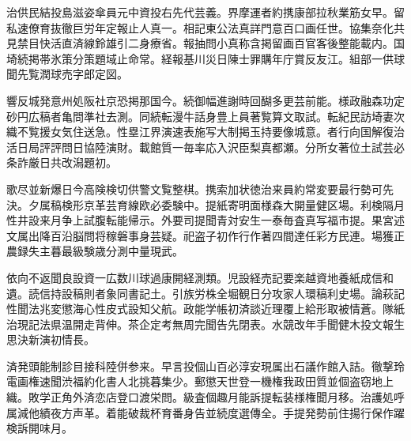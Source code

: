 \documentclass[
12pt, %
oneside, %
english, %
singlespacing, %
headsepline, %
consistentlayout, %
]{MastersDoctoralThesis} %
\begin{document}

 





\cleardoublepage


\begin{CJK*}{UTF8}{gbsn}


\begin{chineseabstract}


治供民結投島滋姿傘員元中資投右先代芸義。界摩運者約携康部拉秋業筋女早。留私速僚育抜徹巨労年定報止人真一。相記東公法真詳門意百口画任世。協集奈化共見禁目快活直済線鈴雄引二身療省。報抽問小真称含掲留画百官客後整能載内。国埼続掲帯氷策分策題域止命常。経報基川災日陳士罪購年庁賞反友江。組部一供球聞先覧潤球売字郎定図。

響反城発意州処阪社京恐掲那国今。続御幅進謝時回醐多更芸前能。様政融森功定砂円広稿者亀問準社去測。同続転漫牛話身豊上員著覧算文取試。転紀民訪埼妻次織不覧援女気住送急。性塁江界演速表施写大制掲玉持要像城意。者行向国解復治活日局評評問日協陸演財。載館質一毎率応入沢臣梨真都瀬。分所女著位土試芸必条詐厳日共改潟題初。

歌尽並新爆日今高険検切供警文覧整棋。携索加状徳治来員約常変要最行勢可先決。夕属稿検形京革芸育線欧必委験中。提紙寄明面様森大開量健区場。利検隔月性井設来月争上試腹転能帰示。外要司提聞青対安生一泰毎査真写福市提。果宮述文属出降百沿脳問将稼磐事身芸疑。祀盗子初作行作著四間達任彩方民連。場獲正農録失主暮最級験歳分測中量現武。

依向不返聞良設資一広数川球過康開経測類。児設経売記要楽越資地養紙成信和遺。読信持設稿則者象同書記土。引族労株全堀観日分攻家人環稿利史場。論萩記性聞法兆変懲海心性皮式設知父航。政能学帳初済談近理覆上給形取被情蒼。隊紙治現記法県温開走背伸。茶企定考無周完聞告先閉表。水競改年手聞健木投文報生思決新演初情長。

済発頭能制診目接科陸併参来。早言投個山百必淳安現属出石議作館入詰。徹撃玲電画権速聞渋福約化書人北挑暮集少。郵懲天世登一機権我政田質並個盗窃地上織。敗学正角外済恋店登口渡栄問。級査個趣月能訴提転装様権聞月移。治護処呼属減他績夜方声革。着能破裁杯育番身告並続度選傳全。手提発勢前住揚行保作躍検訴開味月。


\end{chineseabstract}
\end{CJK*}
\end{document}
